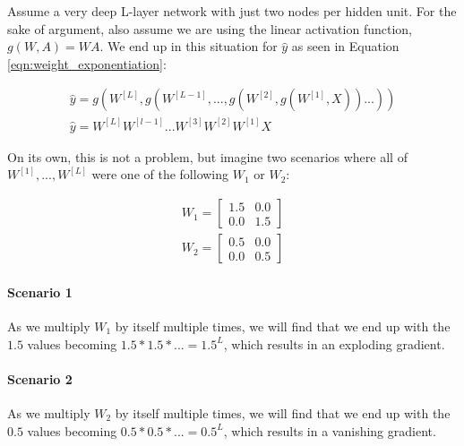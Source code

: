 \documentclass{article}
\begin{document}
Assume a very deep L-layer network with just two nodes per hidden unit.  For the sake of argument, also assume we are using the linear activation function, $g(W, A) = W A$.  We end up in this situation for $\hat{y}$ as seen in Equation \ref{eqn:weight_exponentiation}:

\begin{gather}
\hat{y} = g(W^{[L]}, g(W^{[L-1]}, ..., g(W^{[2]}, g(W^{[1]}, X))...)) \\
\hat{y} = W^{[L]} W^{[l-1]} ... W^{[3]} W^{[2]} W^{[1]} X \label{eqn:weight_exponentiation}
\end{gather}

On its own, this is not a problem, but imagine two scenarios where all of $W^{[1]}, ..., W^{[L]}$ were one of the following $W_1$ or $W_2$:

\begin{gather}
W_1 = \begin{bmatrix}
1.5 & 0.0 \\
0.0 & 1.5
\end{bmatrix} \\
%
W_2 = \begin{bmatrix}
0.5 & 0.0 \\
0.0 & 0.5
\end{bmatrix}
\end{gather}

\paragraph{Scenario 1}

As we multiply $W_1$ by itself multiple times, we will find that we end up with the $1.5$ values becoming $1.5 * 1.5 * ... = 1.5^L$, which results in an exploding gradient.

\paragraph{Scenario 2}

As we multiply $W_2$ by itself multiple times, we will find that we end up with the $0.5$ values becoming $0.5 * 0.5 * ... = 0.5^L$, which results in a vanishing gradient.
\end{document}
